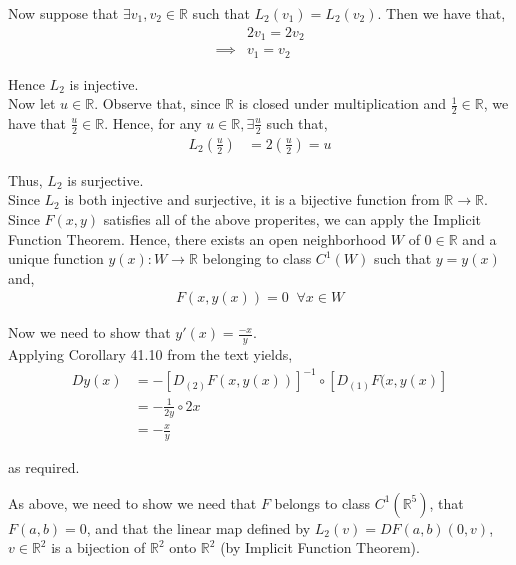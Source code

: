 \documentclass[12pt]{article}
\newenvironment{problem}[2][Problem]{\begin{trivlist}
\item[\hskip \labelsep {\bfseries #1}\hskip \labelsep {\bfseries #2.}]}{\end{trivlist}}
\begin{document}
Now suppose that $\exists v_1, v_2 \in \mathbb{R}$ such that $L_2(v_1) = L_2(v_2)$. Then we have that,
\begin{align*}
&2v_1 = 2v_2\\
\implies &v_1 = v_2
\end{align*}

Hence $L_2$ is injective.\\

Now let $u \in \mathbb{R}$. Observe that, since $\mathbb{R}$ is closed under multiplication and $\frac{1}{2} \in \mathbb{R}$, we have that $\frac{u}{2} \in \mathbb{R}$. Hence, for any $u \in \mathbb{R}, \exists \frac{u}{2}$ such that,
\begin{align*}
L_2\left(\frac{u}{2}\right) &= 2\left(\frac{u}{2}\right) = u
\end{align*}

Thus, $L_2$ is surjective.\\

Since $L_2$ is both injective and surjective, it is a bijective function from $\mathbb{R} \to \mathbb{R}$.\\

Since $F(x, y)$ satisfies all of the above properites, we can apply the Implicit Function Theorem. Hence, there exists an open neighborhood $W$ of $0 \in \mathbb{R}$ and a unique function $y(x): W \to \mathbb{R}$ belonging to class $C^1(W)$ such that $y = y(x)$ and,
\begin{align*}
F(x, y(x)) = 0 \;\; \forall x \in W
\end{align*}

Now we need to show that $y'(x) = \frac{-x}{y}$.\\

Applying Corollary 41.10 from the text yields,
\begin{align*}
Dy(x) &= -[D_{(2)} F(x, y(x))]^{-1} \circ [D_{(1)} F(x, y(x)]\\
&= -\frac{1}{2y} \circ 2x\\
&= -\frac{x}{y}
\end{align*}

as required.

\begin{problem}{2}
\end{problem}

As above, we need to show  we need that $F$ belongs to class $C^1(\mathbb{R}^5)$, that $F(a, b) = 0$, and that the linear map defined by $L_2(v) = DF(a, b)(0, v)$, $v \in \mathbb{R}^2$ is a bijection of $\mathbb{R}^2$ onto $\mathbb{R}^2$ (by Implicit Function Theorem).\\
\end{document}
